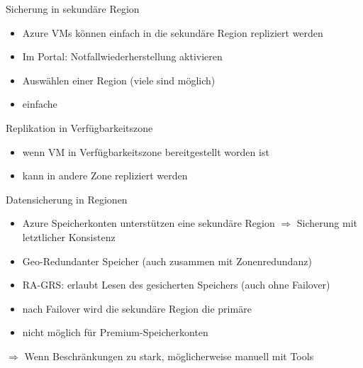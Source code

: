 
\begin{flashcard}[Definition]{Sicherung in sekundäre Region}
  \begin{itemize}
    \item Azure VMs können einfach in die sekundäre Region repliziert werden
    \item Im Portal: Notfallwiederherstellung aktivieren
    \item Auswählen einer Region (viele sind möglich)
    \item einfache
  \end{itemize}
\end{flashcard}

\begin{flashcard}[Definition]{Replikation in Verfügbarkeitszone}
  \begin{itemize}
    \item wenn VM in Verfügbarkeitszone bereitgestellt worden ist
    \item kann in andere Zone repliziert werden
  \end{itemize}
\end{flashcard}

\begin{flashcard}[Definition]{Datensicherung in Regionen}
  \begin{itemize}
    \item Azure Speicherkonten unterstützen eine sekundäre Region\newline
    $\Rightarrow$ Sicherung mit letztlicher Konsistenz
    \item Geo-Redundanter Speicher (auch zusammen mit Zonenredundanz)
    \item RA-GRS: erlaubt Lesen des gesicherten Speichers (auch ohne Failover)
    \item nach Failover wird die sekundäre Region die primäre
    \item nicht möglich für Premium-Speicherkonten
  \end{itemize}
  $\Rightarrow$ Wenn Beschränkungen zu stark, möglicherweise manuell mit Tools
\end{flashcard}

